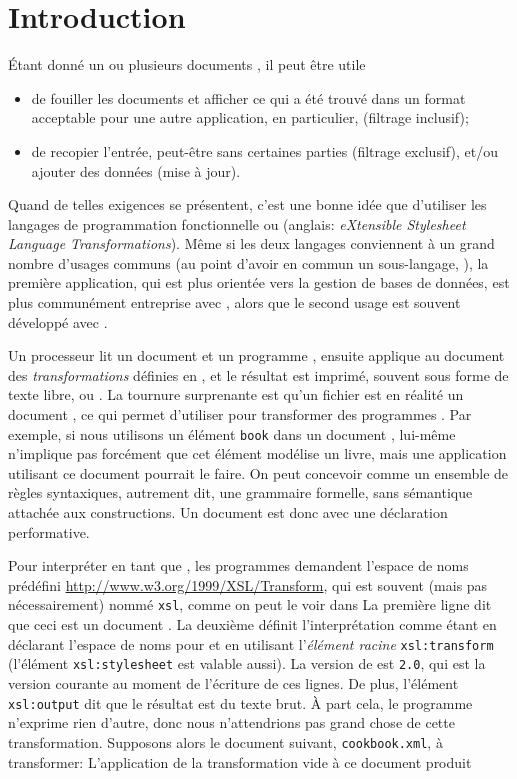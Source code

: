 \section{Introduction}

Étant donné un ou plusieurs documents \XML, il peut être utile
\begin{itemize}

  \item de fouiller les documents et afficher ce qui a été trouvé dans
  un format acceptable pour une autre application, en
  particulier, \XML (filtrage inclusif);

  \item de recopier l'entrée, peut-être sans certaines parties
    (filtrage exclusif), et/ou ajouter des données (mise à jour).

\end{itemize}
Quand de telles exigences se présentent, c'est une bonne idée que
d'utiliser les langages de programmation fonctionnelle \XQuery ou
\XSLT (anglais: \emph{eXtensible Stylesheet Language
  Transformations}). Même si les deux langages conviennent à un grand
nombre d'usages communs (au point d'avoir en commun un sous-langage,
\XPath), la première application, qui est plus orientée vers la
gestion de bases de données, est plus communément entreprise avec
\XQuery, alors que le second usage est souvent développé avec \XSLT.

Un processeur \XSLT lit un document \XML et un programme \XSLT,
ensuite applique au document des \emph{transformations} définies en
\XSLT, et le résultat est imprimé, souvent sous forme de texte libre,
\XML ou \HTML. La tournure surprenante est qu'un fichier \XSLT est en
réalité un document \XML, ce qui permet d'utiliser \XSLT pour
transformer des programmes \XSLT. Par exemple, si nous utilisons un
élément \verb|book| dans un document \XML, \XML lui-même n'implique
pas forcément que cet élément modélise un livre, mais une application
utilisant ce document pourrait le faire. On peut concevoir \XML comme
un ensemble de règles syntaxiques, autrement dit, une grammaire
formelle, sans sémantique attachée aux constructions. Un document
\XSLT est donc \XML avec une déclaration performative.

Pour interpréter \XML en tant que \XSLT, les programmes demandent
l'espace de noms prédéfini
{\small\url{http://www.w3.org/1999/XSL/Transform}}, qui est souvent
(mais pas nécessairement) nommé \texttt{xsl}, comme on peut le voir
dans  La première ligne dit que ceci
est un document \XML. La deuxième définit l'interprétation comme étant
\XSLT en déclarant l'espace de noms pour \XSLT et en utilisant
l'\emph{élément racine} \texttt{xsl:transform} (l'élément
\texttt{xsl:stylesheet} est valable aussi). La version de \XSLT est
\texttt{2.0}, qui est la version courante au moment de l'écriture de
ces lignes. De plus, l'élément \texttt{xsl:output} dit que le résultat
est du texte brut. À part cela, le programme n'exprime rien d'autre,
donc nous n'attendrions pas grand chose de cette
transformation. Supposons alors le document \XML suivant,
\texttt{cookbook.xml}, à transformer:
\noindent L'application de la transformation vide à ce document
produit

